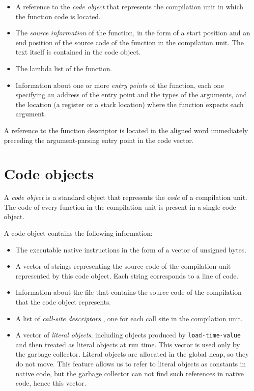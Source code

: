 \begin{itemize}
\item A reference to the \emph{code object}
   that represents the
  compilation unit in which the function code is located.
\item The \emph{source information} of the function, in the form of 
  a start position and an end position of the source code of the
  function in the compilation unit.  The text itself is contained in
  the code object.
\item The lambda list of the function.
\item Information about one or more \emph{entry points} of the
  function, each one specifying an address of the entry point and the
  types of the arguments, and the location (a register or a stack
  location) where the function expects each argument.
\end{itemize}

A reference to the function descriptor is located in the aligned word
immediately preceding the argument-parsing entry point in the code
vector.

\section{Code objects}
\label{data-representation-code-objects}

A \emph{code object} is a standard object that represents the
\emph{code} of a compilation unit.  The code of every function in the
compilation unit is present in a single code object.

A code object contains the following information:

\begin{itemize}
\item The executable native instructions in the form of a vector of
  unsigned bytes.
\item A vector of strings representing the source code of the
  compilation unit represented by this code object.  Each string
  corresponds to a line of code.
\item Information about the file that contains the source code of the
  compilation that the code object represents.
\item A list of \emph{call-site descriptors}
  , one for each call site in the
  compilation unit.
\item A vector of \emph{literal objects}, including objects produced
  by \texttt{load-time-value} and then treated as literal objects at
  run time.  This vector is used only by the garbage collector.
  Literal objects are allocated in the global heap, so they do not
  move.  This feature allows us to refer to literal objects as
  constants in native code, but the garbage collector can not find
  such references in native code, hence this vector.
\end{itemize}

